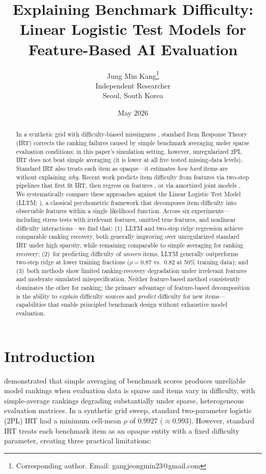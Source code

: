 \documentclass[11pt,a4paper]{article}
\title{Explaining Benchmark Difficulty:\\Linear Logistic Test Models for\\Feature-Based AI Evaluation}
\author{Jung Min Kang\thanks{Corresponding author. Email: gangjeongmin23@gmail.com}\\
Independent Researcher\\
Seoul, South Korea}
\date{May 2026}
\begin{document}
\maketitle

\begin{abstract}
In a synthetic grid with difficulty-biased missingness
\citep{kang2026scaling}, standard Item Response Theory (IRT) corrects the
ranking failures caused by simple benchmark averaging under sparse
evaluation conditions; in this paper's simulation setting, however,
unregularized 2PL IRT does not beat simple averaging (it is lower at all
five tested missing-data levels). Standard IRT also treats each item as
opaque---it estimates \emph{how hard} items are without explaining
\emph{why}. Recent work
predicts item difficulty from features via two-step pipelines that first
fit IRT, then regress on features \citep{ge2026agent}, or via
amortized joint models \citep{truong2025reliable}. We systematically
compare these approaches against the Linear Logistic Test Model (LLTM;
\citealp{fischer1973}), a classical psychometric framework that decomposes
item difficulty into observable features within a single likelihood
function. Across six experiments---including stress tests with irrelevant
features, omitted true features, and nonlinear difficulty
interactions---we find that: (1)~LLTM and two-step ridge regression
achieve comparable ranking recovery, both generally improving over unregularized standard IRT under
high sparsity, while remaining comparable to simple averaging for
ranking recovery; (2)~for predicting difficulty of
\emph{unseen} items, LLTM generally outperforms two-step ridge at lower
training fractions ($\rho = 0.87$ vs.\ $0.82$ at 50\% training data); and (3)~both methods show limited ranking-recovery degradation under
irrelevant features and moderate simulated misspecification. Neither
feature-based method consistently dominates the other for ranking;
the primary advantage of feature-based decomposition is the ability to
\emph{explain} difficulty sources and \emph{predict} difficulty for
new items---capabilities that enable principled benchmark design without
exhaustive model evaluation.
\end{abstract}


\section{Introduction}
\label{sec:intro}

\citet{kang2026scaling} demonstrated that simple averaging of benchmark
scores produces unreliable model rankings when evaluation data is sparse
and items vary in difficulty, with simple-average rankings degrading
substantially under sparse, heterogeneous evaluation matrices. In a synthetic grid sweep, standard two-parameter logistic (2PL) IRT had
a minimum cell-mean $\rho$ of $0.9927$ ($\approx 0.993$). However, standard IRT treats
each benchmark item as an opaque entity with a fixed difficulty parameter,
creating three practical limitations:
\end{document}
